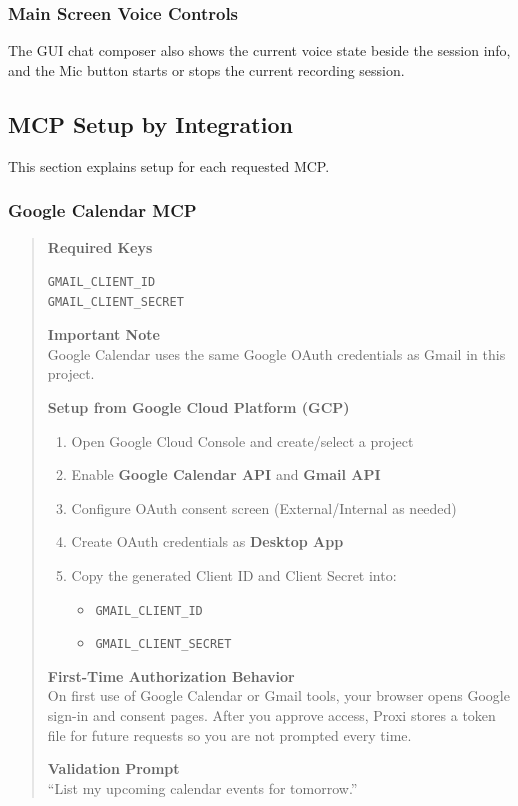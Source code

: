 \documentclass{article}
\begin{document}
\subsubsection{Main Screen Voice Controls}
The GUI chat composer also shows the current voice state beside the session info, and the Mic button starts or stops the current recording session.

\subsection{MCP Setup by Integration}

This section explains setup for each requested MCP.

\subsubsection{Google Calendar MCP}
\begin{quote}
\noindent\textbf{Required Keys}
\begin{verbatim}
GMAIL_CLIENT_ID
GMAIL_CLIENT_SECRET
\end{verbatim}

\noindent\textbf{Important Note}\\
Google Calendar uses the same Google OAuth credentials as Gmail in this project.

\noindent\textbf{Setup from Google Cloud Platform (GCP)}
\begin{enumerate}
	\item Open Google Cloud Console and create/select a project
	\item Enable \textbf{Google Calendar API} and \textbf{Gmail API}
	\item Configure OAuth consent screen (External/Internal as needed)
	\item Create OAuth credentials as \textbf{Desktop App}
	\item Copy the generated Client ID and Client Secret into:
	\begin{itemize}
		\item \texttt{GMAIL\_CLIENT\_ID}
		\item \texttt{GMAIL\_CLIENT\_SECRET}
	\end{itemize}
\end{enumerate}

\medskip
\noindent\textbf{First-Time Authorization Behavior}\\
On first use of Google Calendar or Gmail tools, your browser opens Google sign-in and consent pages. After you approve access, Proxi stores a token file for future requests so you are not prompted every time.

\medskip
\noindent\textbf{Validation Prompt}\\
``List my upcoming calendar events for tomorrow.''
\end{quote}
\end{document}
